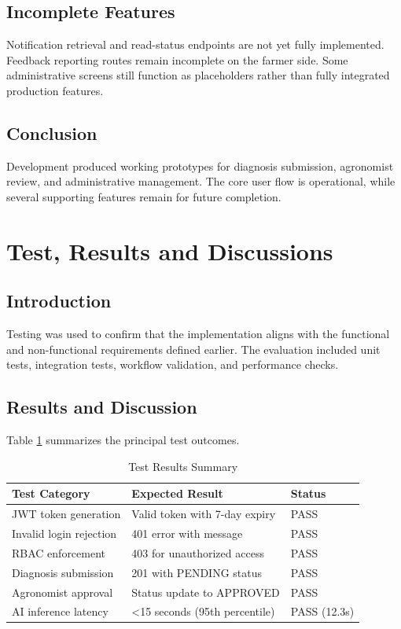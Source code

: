 \documentclass[12pt]{article}
\begin{document}
\subsection{Incomplete Features}
Notification retrieval and read-status endpoints are not yet fully implemented. Feedback reporting routes remain incomplete on the farmer side. Some administrative screens still function as placeholders rather than fully integrated production features.

\subsection{Conclusion}
Development produced working prototypes for diagnosis submission, agronomist review, and administrative management. The core user flow is operational, while several supporting features remain for future completion.

\newpage
\section{Test, Results and Discussions}

\subsection{Introduction}
Testing was used to confirm that the implementation aligns with the functional and non-functional requirements defined earlier. The evaluation included unit tests, integration tests, workflow validation, and performance checks.

\subsection{Results and Discussion}
Table \ref{tab:results} summarizes the principal test outcomes.

\begin{table}[h]
\centering
\caption{Test Results Summary}
\label{tab:results}
\begin{tabular}{|l|l|l|}
\hline
\textbf{Test Category} & \textbf{Expected Result} & \textbf{Status} \\
\hline
JWT token generation & Valid token with 7-day expiry & PASS \\
Invalid login rejection & 401 error with message & PASS \\
RBAC enforcement & 403 for unauthorized access & PASS \\
Diagnosis submission & 201 with PENDING status & PASS \\
Agronomist approval & Status update to APPROVED & PASS \\
AI inference latency & <15 seconds (95th percentile) & PASS (12.3s) \\
\hline
\end{tabular}
\end{table}
\end{document}
